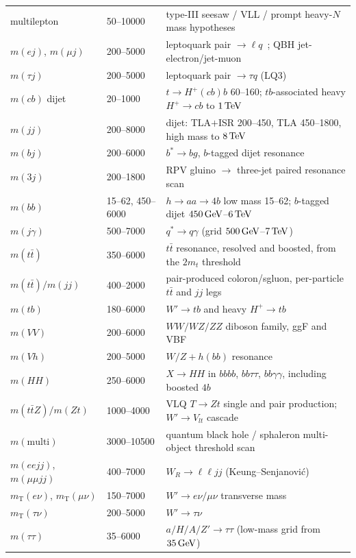 \begin{longtable}{@{}>{\raggedright\arraybackslash}p{} l >{\raggedright\arraybackslash}p{}@{}}
multilepton & 50--10000 & type-III seesaw / VLL / prompt heavy-$N$ mass hypotheses \\
$m(ej)$, $m(\mu j)$ & 200--5000 & leptoquark pair $\to \ell q$~\cite{atlas_dijet_lepton}; QBH jet-electron/jet-muon \\
$m(\tau j)$ & 200--5000 & leptoquark pair $\to \tau q$ (LQ3) \\
$m(cb)$ dijet & 20--1000 & $t\to H^+(cb)b$ 60--160; $tb$-associated heavy $H^+ \to cb$ to $1\,\mathrm{TeV}$ \\
$m(jj)$ & 200--8000 & dijet: TLA$+$ISR 200--450, TLA 450--1800, high mass to $8\,\mathrm{TeV}$ \\
$m(bj)$ & 200--6000 & $b^\ast \to bg$, $b$-tagged dijet resonance~\cite{atlas_btag_dijet} \\
$m(3j)$ & 200--1800 & RPV gluino $\to$ three-jet paired resonance scan \\
$m(bb)$ & 15--62, 450--6000 & $h\to aa\to 4b$ low mass 15--62; $b$-tagged dijet $450\,\mathrm{GeV}$--$6\,\mathrm{TeV}$ \\
$m(j\gamma)$ & 500--7000 & $q^\ast \to q\gamma$ (grid $500\,\mathrm{GeV}$--$7\,\mathrm{TeV}$) \\
$m(t\bar t)$ & 350--6000 & $t\bar t$ resonance, resolved and boosted, from the $2m_t$ threshold \\
$m(t\bar t)/m(jj)$ & 400--2000 & pair-produced coloron/sgluon, per-particle $t\bar t$ and $jj$ legs \\
$m(tb)$ & 180--6000 & $W' \to tb$ and heavy $H^+ \to tb$ \\
$m(VV)$ & 200--6000 & $WW/WZ/ZZ$ diboson family, ggF and VBF \\
$m(Vh)$ & 200--5000 & $W/Z + h(bb)$ resonance \\
$m(HH)$ & 250--6000 & $X\to HH$ in $bbbb$, $bb\tau\tau$, $bb\gamma\gamma$, including boosted $4b$ \\
$m(t\bar tZ)/m(Zt)$ & 1000--4000 & VLQ $T\to Zt$ single and pair production; $W' \to V_{lt}$ cascade \\
$m(\mathrm{multi})$ & 3000--10500 & quantum black hole / sphaleron multi-object threshold scan \\
$m(eejj)$, $m(\mu\mu jj)$ & 400--7000 & $W_R \to \ell\ell jj$ (Keung--Senjanovi\'c) \\
$m_{\mathrm{T}}(e\nu)$, $m_{\mathrm{T}}(\mu\nu)$ & 150--7000 & $W' \to e\nu / \mu\nu$ transverse mass \\
$m_{\mathrm{T}}(\tau\nu)$ & 200--5000 & $W' \to \tau\nu$ \\
$m(\tau\tau)$ & 35--6000 & $a/H/A/Z' \to \tau\tau$ (low-mass grid from $35\,\mathrm{GeV}$) \\

\end{longtable}
